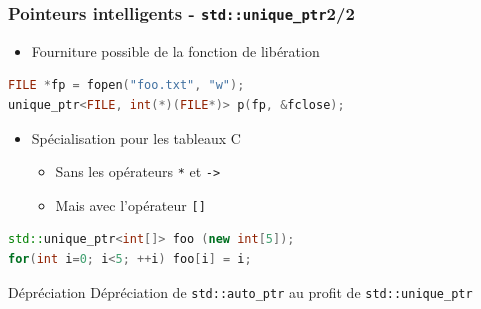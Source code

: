 \documentclass[C++.tex]{subfiles}
\begin{document}
\begin{frame}[fragile]
	\frametitle{Pointeurs intelligents - \lstinline|std::unique_ptr|\titlehfill{}2/2}
	\begin{itemize}
		\item Fourniture possible de la fonction de libération
	\end{itemize}

	\begin{lstlisting}[language=C++]
FILE *fp = fopen("foo.txt", "w");
unique_ptr<FILE, int(*)(FILE*)> p(fp, &fclose);\end{lstlisting}


	\begin{itemize}
		\item Spécialisation pour les tableaux C
		\begin{itemize}
			\item Sans les opérateurs \lstinline|*| et \lstinline|->|
			\item Mais avec l'opérateur \lstinline|[]|
		\end{itemize}
	\end{itemize}

	\begin{lstlisting}[language=C++]
std::unique_ptr<int[]> foo (new int[5]);
for(int i=0; i<5; ++i) foo[i] = i;\end{lstlisting}

	\begin{block}{Dépréciation}
		Dépréciation de \lstinline|std::auto_ptr| au profit de \lstinline|std::unique_ptr|
	\end{block}
\end{frame}
\end{document}
